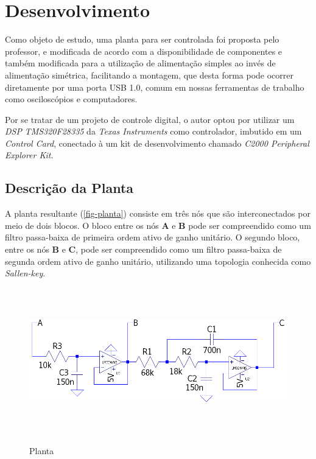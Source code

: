 \documentclass[
	12pt,				%
	article,			%
	openright,			%
	oneside,
	a4paper,			%
	chapter=TITLE,		%
	section=TITLE,		%
	english,			%
	french,				%
	spanish,			%
	brazil,				%
]{abntex2}
\begin{document}
	\section[Desenvolvimento]{Desenvolvimento}

    	Como objeto de estudo, uma planta para ser controlada foi proposta pelo professor, e modificada de acordo com a disponibilidade de componentes e também modificada para a utilização de alimentação simples ao invés de alimentação simétrica, facilitando a montagem, que desta forma pode ocorrer diretamente por uma porta USB 1.0, comum em nossas ferramentas de trabalho como osciloscópios e computadores.
    	
    	Por se tratar de um projeto de controle digital, o autor optou por utilizar um \textit{DSP} \textit{TMS320F28335} da \textit{Texas Instruments} como controlador, imbutido em um \textit{Control Card}, conectado à um kit de desenvolvimento chamado \textit{C2000 Peripheral Explorer Kit}.
    	
    	\subsection{Descrição da Planta}
    	
        	A planta resultante (\autoref{fig-planta}) consiste em três nós que são interconectados por meio de dois blocos. O bloco entre os nós \textbf{A} e \textbf{B} pode ser compreendido como um filtro passa-baixa de primeira ordem ativo de ganho unitário. O segundo bloco, entre os nós \textbf{B} e \textbf{C}, pode ser compreendido como um filtro passa-baixa de segunda ordem ativo de ganho unitário, utilizando uma topologia conhecida como \textit{Sallen-key}. 
        	
        	\begin{figure}[htbp]
        		\centering
        		\caption{Planta}
        		\includegraphics[width=\textwidth,height=240px,keepaspectratio]{imgs/planta.png}
        		\label{fig-planta}
        	\end{figure}
        	
\end{document}
